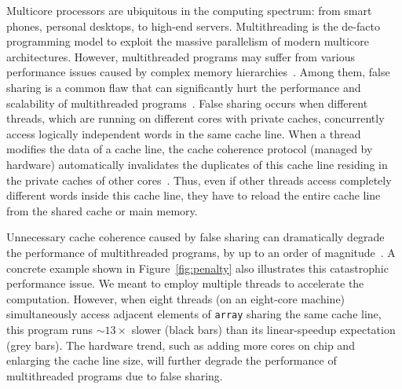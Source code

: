 Multicore processors are ubiquitous in the computing spectrum: from smart phones, personal desktops, to high-end servers. Multithreading is the de-facto programming model to exploit the massive parallelism of modern multicore architectures.
However, multithreaded programs may suffer from various performance issues caused by complex memory hierarchies~\cite{ibs-sc,ibs-sc2,Dramon}. Among them, false sharing is a common flaw that can significantly hurt the performance and scalability of multithreaded programs~\cite{falseshare:effect}. False sharing occurs when different threads, which are running on different cores with private caches, concurrently access logically independent words in the same cache line. When a thread modifies the data of a cache line, the cache coherence protocol (managed by hardware) automatically invalidates the duplicates of this cache line residing in the private caches of other cores~\cite{MESI}. Thus, even if other threads access completely different words inside this cache line, they have to reload the entire cache line from the shared cache or main memory. 

Unnecessary cache coherence caused by false sharing can dramatically degrade the performance of multithreaded programs, by up to an order of magnitude~\cite{falseshare:effect}. A concrete example shown in Figure~\ref{fig:penalty} also illustrates this catastrophic performance issue. We meant to employ multiple threads to accelerate the computation. However, when eight threads (on an eight-core machine) simultaneously access adjacent elements of {\tt array} sharing the same cache line, this program runs $\sim13\times$ slower (black bars) than its linear-speedup expectation (grey bars).
The hardware trend, such as adding more cores on chip and enlarging the cache line size, will further degrade the performance of multithreaded programs due to false sharing.

